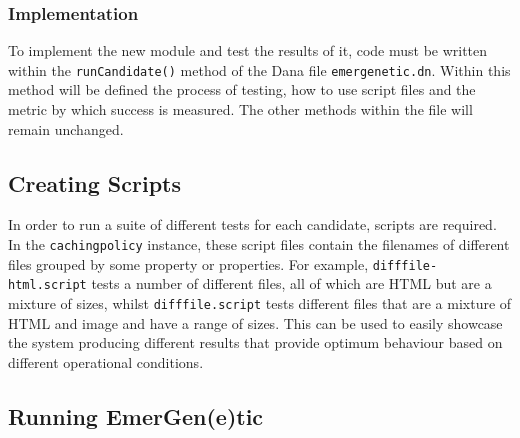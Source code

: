 \documentclass[compsoc,12pt,a4paper]{IEEEtran}
\begin{document}
			\subsubsection{Implementation}
			
				To implement the new module and test the results of it, code must be written within the \lstinline|runCandidate()| method of the Dana file \lstinline|emergenetic.dn|. Within this method will be defined the process of testing, how to use script files and the metric by which success is measured. The other methods within the file will remain unchanged.
					
		\subsection{Creating Scripts}
		
			In order to run a suite of different tests for each candidate, scripts are required. In the \lstinline|cachingpolicy| instance, these script files contain the filenames of different files grouped by some property or properties. For example, \lstinline|difffile-html.script| tests a number of different files, all of which are HTML but are a mixture of sizes, whilst \lstinline|difffile.script| tests different files that are a mixture of HTML and image and have a range of sizes. This can be used to easily showcase the system producing different results that provide optimum behaviour based on different operational conditions.
						
		\subsection{Running EmerGen(e)tic}
		
\end{document}

